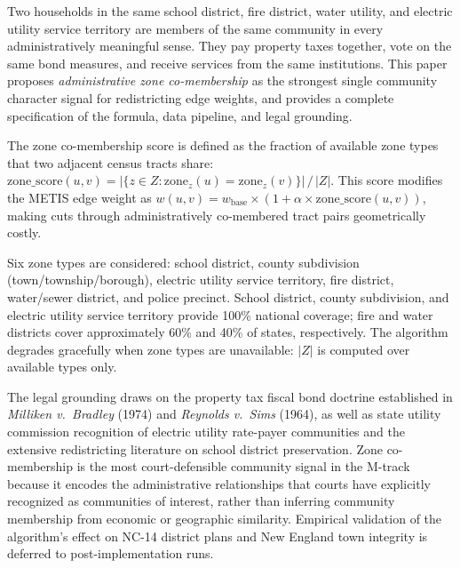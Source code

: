 Two households in the same school district, fire district, water utility, and electric
utility service territory are members of the same community in every administratively
meaningful sense.
They pay property taxes together, vote on the same bond measures, and receive services
from the same institutions.
This paper proposes \emph{administrative zone co-membership} as the strongest single
community character signal for redistricting edge weights, and provides a complete
specification of the formula, data pipeline, and legal grounding.

The zone co-membership score is defined as the fraction of available zone types
that two adjacent census tracts share:
$\mathrm{zone\_score}(u,v) = |\{z \in Z : \mathrm{zone}_z(u) = \mathrm{zone}_z(v)\}| \,/\, |Z|$.
This score modifies the METIS edge weight as
$w(u,v) = w_{\mathrm{base}} \times (1 + \alpha \times \mathrm{zone\_score}(u,v))$,
making cuts through administratively co-membered tract pairs geometrically costly.

Six zone types are considered: school district, county subdivision (town/township/borough),
electric utility service territory, fire district, water/sewer district, and police precinct.
School district, county subdivision, and electric utility service territory provide 100\%
national coverage; fire and water districts cover approximately 60\% and 40\% of states,
respectively.
The algorithm degrades gracefully when zone types are unavailable: $|Z|$ is computed
over available types only.

The legal grounding draws on the property tax fiscal bond doctrine established in
\textit{Milliken v.\ Bradley} (1974) and \textit{Reynolds v.\ Sims} (1964),
as well as state utility commission recognition of electric utility rate-payer
communities and the extensive redistricting literature on school district preservation.
Zone co-membership is the most court-defensible community signal in the M-track
because it encodes the administrative relationships that courts have explicitly
recognized as communities of interest, rather than inferring community membership
from economic or geographic similarity.
Empirical validation of the algorithm's effect on NC-14 district plans and New England
town integrity is deferred to post-implementation runs.
